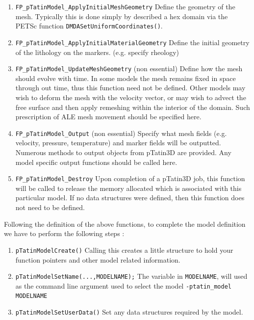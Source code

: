 \documentclass[paper=a4, fontsize=11pt,twoside]{scrartcl}
\newcommand{\ptat}{{{\sc pTatin3D}}}
\newcommand{\unix}[1]{\texttt{\footnotesize #1}}
\begin{document}
{{\begin{enumerate}
	\item \unix{FP\_pTatinModel\_ApplyInitialMeshGeometry}
	Define the geometry of the mesh. Typically this is done simply by described a hex domain via the PETSc function \unix{DMDASetUniformCoordinates()}.

	\item \unix{FP\_pTatinModel\_ApplyInitialMaterialGeometry}
	Define the initial geometry of the lithology on the markers. (e.g. specify rheology)

	\item \unix{FP\_pTatinModel\_UpdateMeshGeometry} (non essential)
	Define how the mesh should evolve with time. In some models the mesh remains fixed in space through out time, thus this function need not be defined. Other models may wish to deform the mesh with the velocity vector, or may wish to advect the free surface and then apply remeshing within the interior of the domain. Such prescription of ALE mesh movement should be specified here.

	\item \unix{FP\_pTatinModel\_Output} (non essential)
	Specify what mesh fields (e.g. velocity, pressure, temperature) and marker fields will be outputted. Numerous
	methods to output objects from {\ptat} are provided. Any model specific output functions should be called here.

	\item \unix{FP\_pTatinModel\_Destroy} 
	Upon completion of a {\ptat} job, this function will be called to release the memory allocated which is associated 
	with this particular model. If no data structures were defined, then this function does not need to be defined.
\end{enumerate}

Following the definition of the above functions, to complete the model definition we have to perform the following steps :
\begin{enumerate}
	\item \unix{pTatinModelCreate()}
Calling this creates a little structure to hold your function pointers and other model related information.

	\item \unix{pTatinModelSetName(...,MODELNAME);}
The variable in \unix{MODELNAME}, will used as the command line argument used to select the model
	\unix{-ptatin\_model MODELNAME}

	\item \unix{pTatinModelSetUserData()}
Set any data structures required by the model.


\end{enumerate}}}
\end{document}
